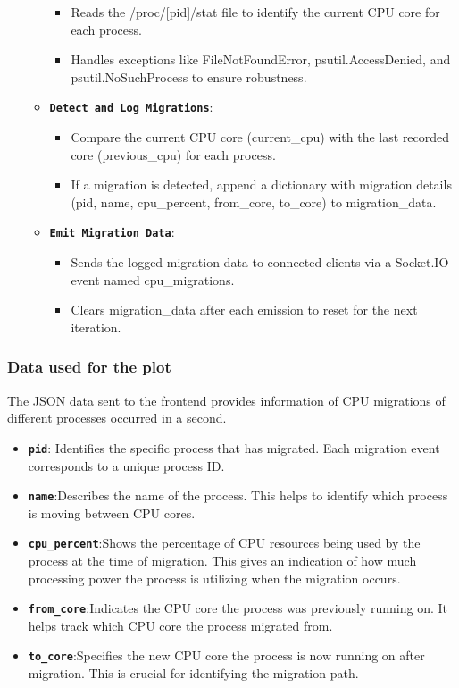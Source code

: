 \documentclass[12pt]{article}
\begin{document}
\begin{itemize}
\begin{itemize}
\begin{itemize}
            \item Reads the /proc/[pid]/stat file to identify the current CPU core for each process.
            \item Handles exceptions like FileNotFoundError, psutil.AccessDenied, and psutil.NoSuchProcess to ensure robustness.
       \end{itemize}
        \item \textbf{\texttt{Detect and Log Migrations}}:
        \begin{itemize}
            \item Compare the current CPU core (current\_cpu) with the last recorded core (previous\_cpu) for each process.
            \item If a migration is detected, append a dictionary with migration details (pid, name, cpu\_percent, from\_core, to\_core) to migration\_data.
        \end{itemize}
\item \textbf{\texttt{Emit Migration Data}}:
\begin{itemize}
          \item Sends the logged migration data to connected clients via a Socket.IO event named cpu\_migrations.
          \item Clears migration\_data after each emission to reset for the next iteration.
\end{itemize}
    \end{itemize}
\end{itemize}   
\subsubsection{Data used for the plot}
The JSON data sent to the frontend provides information of CPU migrations of different processes occurred in a second.
\begin{itemize}
  \item \textbf{\texttt{pid}}: Identifies the specific process that has migrated. Each migration event corresponds to a unique process ID.
  \item \textbf{\texttt{name}}:Describes the name of the process. This helps to identify which process is moving between CPU cores.
  \item \textbf{\texttt{cpu\_percent}}:Shows the percentage of CPU resources being used by the process at the time of migration. This gives an indication of how much processing power the process is utilizing when the migration occurs.
  \item \textbf{\texttt{from\_core}}:Indicates the CPU core the process was previously running on. It helps track which CPU core the process migrated from.
  \item \textbf{\texttt{to\_core}}:Specifies the new CPU core the process is now running on after migration. This is crucial for identifying the migration path.
\end{itemize}
\end{document}
